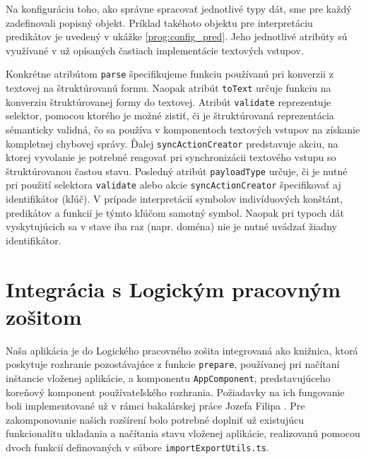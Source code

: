 Na konfiguráciu toho, ako správne spracovať jednotlivé typy dát, sme pre každý zadefinovali popisný objekt. Príklad takéhoto objektu pre interpretáciu predikátov je uvedený v ukážke \ref{prog:config_pred}. Jeho jednotlivé atribúty sú využívané v už opísaných častiach implementácie textových vstupov.

Konkrétne atribútom \texttt{parse} špecifikujeme funkciu používanú pri konverzii z textovej na štruktúrovanú formu. Naopak atribút \texttt{toText} určuje funkciu na konverziu štruktúrovanej formy do textovej. Atribút \texttt{validate} reprezentuje selektor, pomocou ktorého je možné zistiť, či je štruktúrovaná reprezentácia sémanticky validná, čo sa používa v komponentoch textových vstupov na získanie kompletnej chybovej správy. Ďalej \texttt{syncActionCreator} predstavuje akciu, na ktorej vyvolanie je potrebné reagovať pri synchronizácii textového vstupu so štruktúrovanou častou stavu. Posledný atribút \texttt{payloadType} určuje, či je nutné pri použití selektora \texttt{validate} alebo akcie \texttt{syncActionCreator} špecifikovať aj identifikátor (kľúč). V prípade interpretácií symbolov indivíduových konštánt, predikátov a funkcií je týmto kľúčom samotný symbol. Naopak pri typoch dát vyskytujúcich sa v stave iba raz (napr. doména) nie je nutné uvádzať žiadny identifikátor.



\section{Integrácia s Logickým pracovným zošitom}
Naša aplikácia je do Logického pracovného zošita integrovaná ako knižnica, ktorá poskytuje rozhranie pozostávajúce z funkcie \texttt{prepare}, používanej pri načítaní inštancie vloženej aplikácie, a komponentu \texttt{AppComponent}, predstavujúceho koreňový komponent používateľského rozhrania. Požiadavky na ich fungovanie boli implementované už v rámci bakalárskej práce Jozefa Filipa \cite{filip2025}. Pre zakomponovanie našich rozšírení bolo potrebné doplniť už existujúcu funkcionalitu ukladania a načítania stavu vloženej aplikácie, realizovanú pomocou dvoch funkcií definovaných v súbore \texttt{importExportUtils.ts}.


